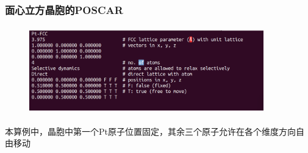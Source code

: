 \frame
{
	\frametitle{面心立方晶胞的\textrm{POSCAR}}
\begin{figure}[h!]
\centering
\includegraphics[height=1.5in,width=4.0in,viewport=0 30 740 270,clip]{Figures/Pt_FCC-POSCAR.png}
\caption{\fontsize{6.2pt}{5.2pt}}%
\label{Pt_FCC:POSCAR}
\end{figure}
本算例中，晶胞中第一个\textrm{Pt}原子位置固定，其余三个原子允许在各个维度方向自由移动\\
{\fontsize{7.0pt}{5.2pt}}
}

